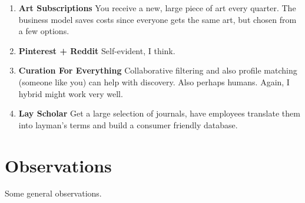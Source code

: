 \documentclass[paper=a4, fontsize=11pt]{scrartcl} %
\numberwithin{equation}{section} %
\numberwithin{figure}{section} %
\numberwithin{table}{section} %
\begin{document}
\begin{enumerate}
\item \textbf{Art Subscriptions} You receive a new, large piece of art every quarter.  The business model saves costs since everyone gets the same art, but chosen from a few options. 

\item \textbf{Pinterest + Reddit} Self-evident, I think.

\item \textbf{Curation For Everything} Collaborative filtering and also profile matching (someone like you) can help with discovery.  Also perhaps humans.  Again, I hybrid might work very well.  

\item \textbf{Lay Scholar} Get a large selection of journals, have employees translate them into layman's terms and build a consumer friendly database.  


\end{enumerate}




\section{Observations}

Some general observations.
 
\end{document}
